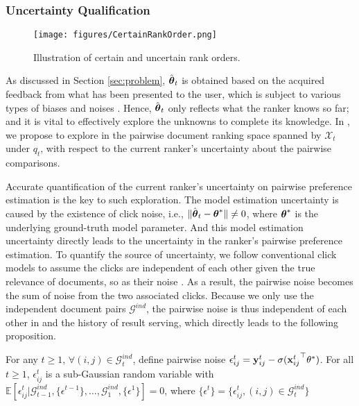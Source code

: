 \subsubsection{Uncertainty Qualification}
\begin{figure}[t]
  \centering
  \texttt{[image: figures/CertainRankOrder.png]}
  \vspace{-2mm}
  \caption{Illustration of certain and uncertain rank orders.}
  \label{fig:certain_rank}
  \vspace{-2mm}
\end{figure}

As discussed in Section \ref{sec:problem}, $\hat{\boldsymbol{\theta}}_t$ is obtained based on the acquired feedback from what has been presented to the user, which is subject to various types of biases and noises \cite{joachims2005accurately,agichtein2006improving,joachims2007evaluating}. Hence, $\hat{\boldsymbol{\theta}}_t$ only reflects what the ranker knows so far; and it is vital to effectively explore the unknowns to complete its knowledge. In \model{}, we propose to explore in the pairwise document ranking space spanned by $\mathcal{X}_t$ under $q_t$, with respect to the current ranker's uncertainty about the pairwise comparisons.

Accurate quantification of the current ranker's uncertainty on pairwise preference estimation is the key to such exploration. The model estimation uncertainty is caused by the existence of click noise, i.e., $\Vert\hat{\boldsymbol{\theta}}_t - \boldsymbol{\theta}^*\Vert \neq 0$, where $\boldsymbol{\theta}^*$ is the underlying ground-truth model parameter. And this model estimation uncertainty directly leads to the uncertainty in the ranker's pairwise preference estimation. 
To quantify the source of uncertainty, we follow conventional click models to assume the clicks are independent of each other given the true relevance of documents, so as their noise \cite{joachims2005accurately,guo2009click,guo2009efficient}. As a result, the pairwise noise becomes the sum of noise from the two associated clicks. Because we only use the independent document pairs $\mathcal{G}^{ind}$, the pairwise noise is thus independent of each other in \model{} and the history of result serving, which directly leads to the following proposition.

\begin{proposition}
For any $t \geq 1$, $\forall (i, j) \in \mathcal{G}_t^{ind}$, define pairwise noise $\epsilon_{ij}^t = {\mathbf{y}_{ij}^t} - \sigma({\mathbf{x}_{ij}^t}^\top\theta^*)$. For all $t \geq 1$, $\epsilon_{ij}^t$ is a sub-Gaussian random variable with $\mathbb{E}[\epsilon_{ij}^t| \mathcal{G}_{t-1}^{ind}, \{\epsilon^{t-1}\}, \dots, \mathcal{G}_{1}^{ind}, \{\epsilon^{1}\}] = 0$, where $\{\epsilon^t\} = \{\epsilon_{ij}^t, (i, j)\in\mathcal{G}_t^{ind}\}$
\end{proposition}

